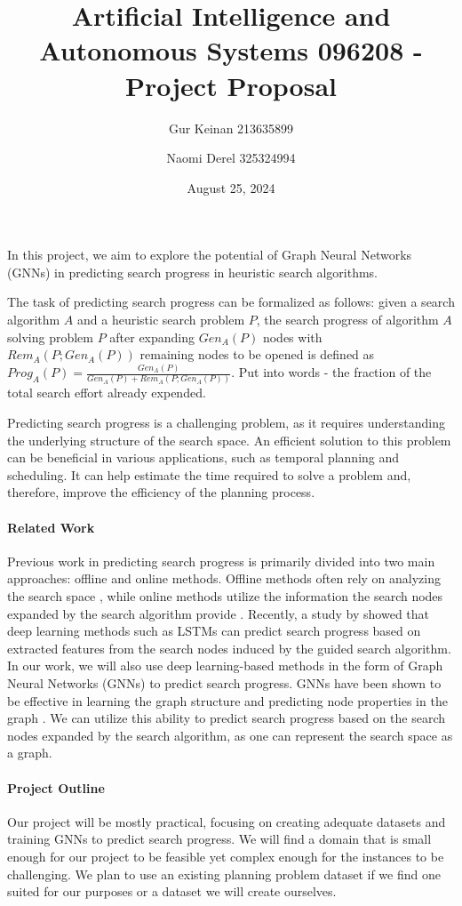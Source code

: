\documentclass[12pt]{article}
\title{Artificial Intelligence and Autonomous Systems 096208 - Project Proposal}
\author{Gur Keinan 213635899 \and Naomi Derel 325324994}
\date{August 25, 2024}
\begin{document}
\maketitle

In this project, we aim to explore the potential of Graph Neural Networks (GNNs) in predicting search progress in heuristic search algorithms.

The task of predicting search progress can be formalized as follows: given a search algorithm $A$ and a heuristic search problem $P$, the search progress of algorithm $A$ solving problem $P$ after expanding $Gen_A(P)$ nodes with $Rem_A(P; Gen_A(P))$ remaining nodes to be opened is defined as $Prog_A(P) = \frac{Gen_A(P)}{Gen_A(P) + Rem_A(P; Gen_A(P))}$.
Put into words - the fraction of the total search effort already expended.

Predicting search progress is a challenging problem, as it requires understanding the underlying structure of the search space.
An efficient solution to this problem can be beneficial in various applications, such as temporal planning and scheduling. It can help estimate the time required to solve a problem and, therefore, improve the efficiency of the planning process.

\paragraph{Related Work} Previous work in predicting search progress is primarily divided into two main approaches: offline and online methods. Offline methods often rely on analyzing the search space \citep{breyer2008recent}, while online methods utilize the information the search nodes expanded by the search algorithm provide \citep{thayer2012we}.
Recently, a study by \citet{sudry2022learning} showed that deep learning methods such as LSTMs can predict search progress based on extracted features from the search nodes induced by the guided search algorithm. In our work, we will also use deep learning-based methods in the form of Graph Neural Networks (GNNs) to predict search progress. GNNs have been shown to be effective in learning the graph structure and predicting node properties in the graph \citep{wu2020comprehensive, scarselli2008graph}. We can utilize this ability to predict search progress based on the search nodes expanded by the search algorithm, as one can represent the search space as a graph.

\paragraph{Project Outline} Our project will be mostly practical, focusing on creating adequate datasets and training GNNs to predict search progress. We will find a domain that is small enough for our project to be feasible yet complex enough for the instances to be challenging. We plan to use an existing planning problem dataset if we find one suited for our purposes or a dataset we will create ourselves.
\end{document}
